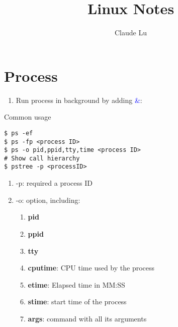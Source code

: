 \documentclass[12pt,a4paper]{article}
\title{Linux Notes}
\author{Claude Lu}
\newcommand{\bt}[1]{\textcolor{blue}{#1}}
\begin{document}
\maketitle
\section{Process}
\begin{enumerate}
	\item Run process in background by adding \bt{ \&}:
\end{enumerate}
Common usage
\begin{footnotesize}
\begin{verbatim}
$ ps -ef
$ ps -fp <process ID>
$ ps -o pid,ppid,tty,time <process ID>
# Show call hierarchy
$ pstree -p <processID>
\end{verbatim}
\begin{enumerate}
	\item -p: required a process ID
	\item -o: option, including:
	\begin{enumerate}
		\item \textbf{pid}
		\item \textbf{ppid}
		\item \textbf{tty}
		\item \textbf{cputime}: CPU time used by the process
		\item \textbf{etime}: Elapsed time in MM:SS
		\item \textbf{stime}: start time of the process
		\item \textbf{args}: command with all its arguments
	\end{enumerate}
\end{enumerate}
\end{footnotesize}
\end{document}
